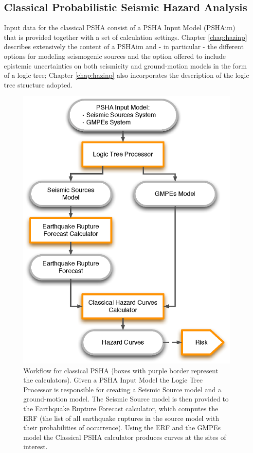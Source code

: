 \subsection{Classical Probabilistic Seismic Hazard Analysis}
\label{section:classicalPSHA}
%
Input data for the classical PSHA consist of a PSHA Input Model (PSHAim) that 
is provided together with a set of calculation settings. 
%
Chapter \ref{chap:hazinp} describes extensively the content of a PSHAim and 
- in particular - the different options for modeling seismogenic sources 
and the option offered to include epistemic uncertainties on both seismicity 
and ground-motion models in the form of a logic tree; Chapter 
\ref{chap:hazinp} also incorporates the description of the logic tree 
structure adopted.
%
\begin{figure}[htbp]
\begin{center}
\includegraphics[width=12cm]{./Figures/Part_Hazard/classical_psha_workflow.eps}
\caption{Workflow for classical PSHA (boxes with purple border represent the 
calculators). Given a PSHA Input Model 
the Logic Tree Processor is responsible for creating a Seismic Source model
and a ground-motion model. 
The Seismic Source model is then provided to the Earthquake Rupture Forecast 
calculator, which computes the ERF (the list of all earthquake ruptures in the 
source model with their probabilities of occurrence). 
Using the ERF and the GMPEs model the Classical PSHA calculator produces 
curves at the sites of interest.}
\label{classical_psha_workflow}
\end{center}
\end{figure}
